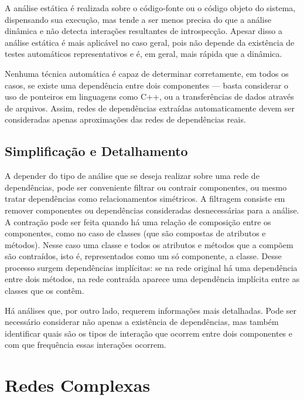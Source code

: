 \documentclass{article}
\begin{document}
A análise estática é realizada sobre o código-fonte ou o código objeto do sistema, dispensando sua execução, mas tende a ser menos precisa do que a análise dinâmica e não detecta interações resultantes de introspecção. Apesar disso a análise estática é mais aplicável no caso geral, pois não depende da existência de testes automáticos representativos e é, em geral, mais rápida que a dinâmica.

Nenhuma técnica automática é capaz de determinar corretamente, em todos os casos, se existe uma dependência entre dois componentes --- basta considerar o uso de ponteiros em linguagens como C++, ou a transferências de dados através de arquivos. Assim, redes de dependências extraídas automaticamente devem ser consideradas apenas aproximações das redes de dependências reais.

\subsection{Simplificação e Detalhamento}

A depender do tipo de análise que se deseja realizar sobre uma rede de dependências, pode ser conveniente filtrar ou contrair componentes, ou mesmo tratar dependências como relacionamentos simétricos. A filtragem consiste em remover componentes ou dependências consideradas desnecessárias para a análise. A contração pode ser feita quando há uma relação de composição entre os componentes, como no caso de classes (que são compostas de atributos e métodos). Nesse caso uma classe e todos os atributos e métodos que a compõem são contraídos, isto é, representados como um só componente, a classe. Desse processo surgem dependências implícitas: se na rede original há uma dependência entre dois métodos, na rede contraída aparece uma dependência implícita entre as classes que os contêm. %

Há análises que, por outro lado, requerem informações mais detalhadas. Pode ser necessário considerar não apenas a existência de dependências, mas também identificar quais são os tipos de interação que ocorrem entre dois componentes e com que frequência essas interações ocorrem.

\section{Redes Complexas}
\end{document}
